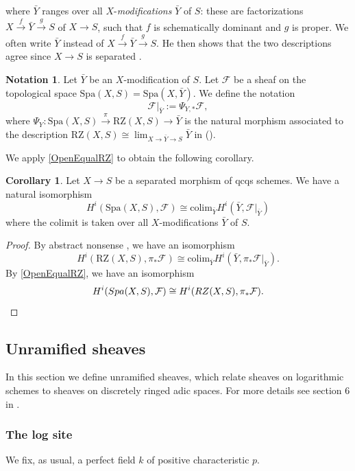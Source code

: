 \documentclass{amsart}
\def\Spa{\textrm{Spa}}
\def\RZ{\textrm{RZ}}
\theoremstyle{definition}
\newtheorem{corollary}[theorem]{Corollary}
\newtheorem{notation}[theorem]{Notation}
\numberwithin{equation}{section}
\begin{document}
where $\bar{Y}$ ranges over all $X$-\textit{modifications} $\bar{Y}$ of $S$: these are factorizations $X\xrightarrow{f}\bar{Y}\xrightarrow{g} S$ of $X\to S$, such that $f$ is schematically dominant and $g$  is proper. We often write $\bar{Y}$ instead of $X\xrightarrow{f}\bar{Y}\xrightarrow{g} S$. He then shows that the two descriptions agree since $X\to S$ is separated \cite[Corollary 3.4.7 and Theorem 3.5.1]{TemkinRZ}.
\begin{notation}\label{Notation|Y}
	Let $\bar{Y}$ be an $X$-modification of $S$. Let $\mathcal{F}$ be a sheaf on the topological space $\Spa(X,S)=\Spa(X,\bar{Y})$. We define the notation
\[		
\mathcal{F}|_{\bar{Y}}:= \Psi_{Y,*}\mathcal{F},
\]
	where $\Psi_Y:\Spa(X,S) \xrightarrow{\pi} \RZ(X,S)\to \bar{Y}$ is the natural morphism associated to the description $ \RZ(X,S)\cong \lim_{X\to\bar{Y}\to S}\bar{Y} $ in  ().
\end{notation}
We apply \cite[Chapter 0, Corollary 3.1.20]{FujiwaraFoundationsRigidGeometry} \cref{OpenEqualRZ} to obtain the following corollary.
\begin{corollary}\label{CohomologyIsColimit}
	Let $X\to S$ be a separated morphism of qcqs schemes. We have a natural isomorphism
	\[H^i(\Spa(X,S),\mathcal{F})\cong \textrm{colim}_{\bar{Y}} H^i(\bar{Y},\mathcal{F}|_{\bar{Y}})
	\]
	where the colimit is taken over all $X$-modifications $\bar{Y}$ of $S$.
\end{corollary}
 \begin{proof}
 	By abstract nonsense \cite[Chapter 0, Corollary 3.1.20]{FujiwaraFoundationsRigidGeometry}, we have an isomorphism
	\[
	H^i(\RZ(X,S),\pi_*\mathcal{F}) \cong \textrm{colim}_{\bar{Y}} H^i(\bar{Y},\pi_*\mathcal{F}|_{\bar{Y}}).
	\]
	By \cref{OpenEqualRZ}, we have an isomorphism 
	\[
	H^i(\Spa(X,S),\mathcal{F})\cong H^i(\RZ(X,S),\pi_*\mathcal{F}).\qedhere
	\]
 \end{proof}

\subsection{Unramified sheaves}
In this section we define unramified sheaves, which relate sheaves on logarithmic schemes to sheaves on discretely ringed adic spaces. For more details see section 6 in \cite{LogDiff}.
\subsubsection*{The log site}
We fix, as usual, a perfect field $k$ of positive characteristic $p$. 
\end{document}
